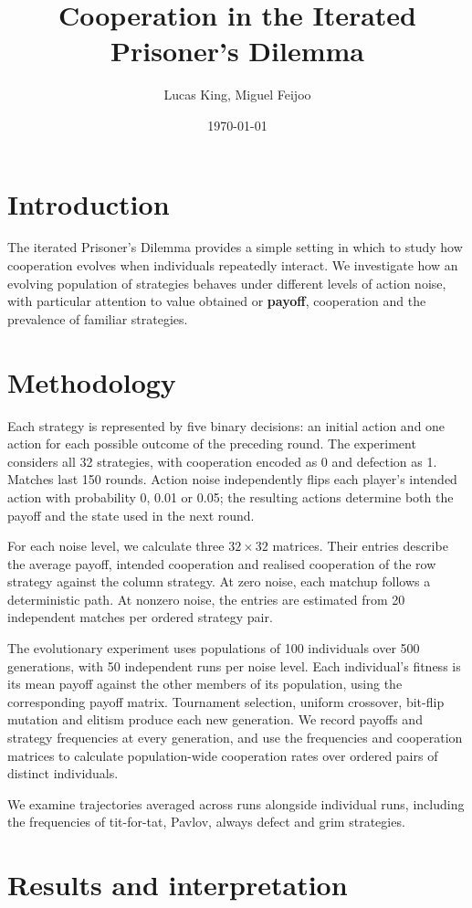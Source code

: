 \documentclass[11pt]{article}
\title{Cooperation in the Iterated Prisoner's Dilemma}
\author{Lucas King, Miguel Feijoo}
\date{\today}
\begin{document}
\maketitle

\section{Introduction}
The iterated Prisoner's Dilemma provides a simple setting in which to study how cooperation evolves when individuals repeatedly interact. We investigate how an evolving population of strategies behaves under different levels of action noise, with particular attention to value obtained or \textbf{payoff}, cooperation and the prevalence of familiar strategies.

\section{Methodology}
Each strategy is represented by five binary decisions: an initial action and one action for each possible outcome of the preceding round. The experiment considers all 32 strategies, with cooperation encoded as 0 and defection as 1. Matches last 150 rounds. Action noise independently flips each player's intended action with probability 0, 0.01 or 0.05; the resulting actions determine both the payoff and the state used in the next round.

For each noise level, we calculate three $32 \times 32$ matrices. Their entries describe the average payoff, intended cooperation and realised cooperation of the row strategy against the column strategy. At zero noise, each matchup follows a deterministic path. At nonzero noise, the entries are estimated from 20 independent matches per ordered strategy pair.

The evolutionary experiment uses populations of 100 individuals over 500 generations, with 50 independent runs per noise level. Each individual's fitness is its mean payoff against the other members of its population, using the corresponding payoff matrix. Tournament selection, uniform crossover, bit-flip mutation and elitism produce each new generation. We record payoffs and strategy frequencies at every generation, and use the frequencies and cooperation matrices to calculate population-wide cooperation rates over ordered pairs of distinct individuals.

We examine trajectories averaged across runs alongside individual runs, including the frequencies of tit-for-tat, Pavlov, always defect and grim strategies. %

\section{Results and interpretation}
\end{document}
